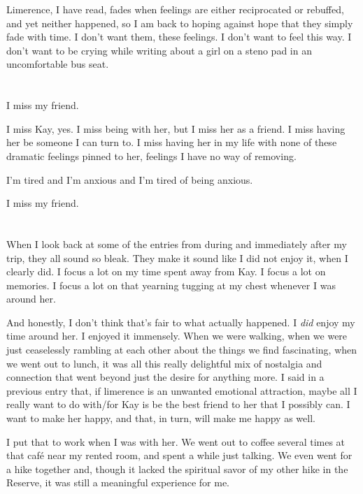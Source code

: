 Limerence, I have read, fades when feelings are either reciprocated or rebuffed, and yet neither happened, so I am back to hoping against hope that they simply fade with time. I don't want them, these feelings. I don't want to feel this way. I don't want to be crying while writing about a girl on a steno pad in an uncomfortable bus seat.

\section{}

I miss my friend.

I miss Kay, yes. I miss being with her, but I miss her as a friend. I miss having her be someone I can turn to. I miss having her in my life with none of these dramatic feelings pinned to her, feelings I have no way of removing.

I'm tired and I'm anxious and I'm tired of being anxious.

I miss my friend.

\section{}

When I look back at some of the entries from during and immediately after my trip, they all sound so bleak. They make it sound like I did not enjoy it, when I clearly did. I focus a lot on my time spent away from Kay. I focus a lot on memories. I focus a lot on that yearning tugging at my chest whenever I was around her.

And honestly, I don't think that's fair to what actually happened. I \emph{did} enjoy my time around her. I enjoyed it immensely. When we were walking, when we were just ceaselessly rambling at each other about the things we find fascinating, when we went out to lunch, it was all this really delightful mix of nostalgia and connection that went beyond just the desire for anything more. I said in a previous entry that, if limerence is an unwanted emotional attraction, maybe all I really want to do with/for Kay is be the best friend to her that I possibly can. I want to make her happy, and that, in turn, will make me happy as well.

I put that to work when I was with her. We went out to coffee several times at that café near my rented room, and spent a while just talking. We even went for a hike together and, though it lacked the spiritual savor of my other hike in the Reserve, it was still a meaningful experience for me.


